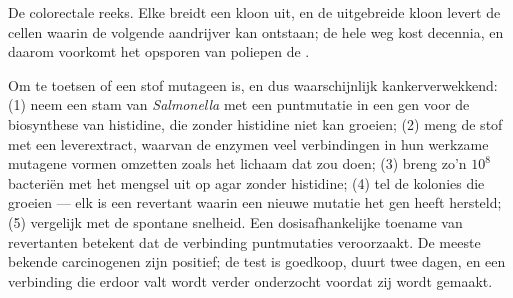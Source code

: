 \begin{omfigure}

{\small De colorectale reeks. Elke  breidt een kloon
uit, en de uitgebreide kloon levert de cellen waarin de volgende
aandrijver kan ontstaan; de hele weg kost decennia, en daarom voorkomt
het opsporen van poliepen de .}
\end{omfigure}

\begin{method}[De amestest]\label{met:b3:cancer-biology:ames}
Om te toetsen of een stof mutageen is, en dus waarschijnlijk
kankerverwekkend: (1) neem een stam van \emph{Salmonella} met een
puntmutatie in een gen voor de biosynthese van histidine, die zonder
histidine niet kan groeien; (2) meng de stof met een leverextract,
waarvan de enzymen veel verbindingen in hun werkzame mutagene vormen
omzetten zoals het lichaam dat zou doen; (3) breng zo'n $10^{8}$
bacteriën met het mengsel uit op agar zonder histidine; (4) tel de
kolonies die groeien --- elk is een revertant waarin een nieuwe mutatie
het gen heeft hersteld; (5) vergelijk met de spontane snelheid. Een
dosisafhankelijke toename van revertanten betekent dat de verbinding
puntmutaties veroorzaakt. De meeste bekende carcinogenen zijn positief;
de test is goedkoop, duurt twee dagen, en een verbinding die erdoor
valt wordt verder onderzocht voordat zij wordt gemaakt.
\end{method}

